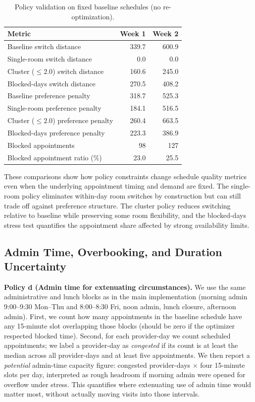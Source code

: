 \documentclass[12pt]{article}
\begin{document}
\begin{table}[h]
  \centering
  \caption{Policy validation on fixed baseline schedules (no re-optimization).}
  \label{tab:policy_validation}
  \begin{tabular}{lrr}
    \toprule
    Metric & Week 1 & Week 2 \\
    \midrule
    Baseline switch distance                  & 339.7 & 600.9 \\
    Single-room switch distance               & 0.0   & 0.0   \\
    Cluster ($\le 2.0$) switch distance       & 160.6 & 245.0 \\
    Blocked-days switch distance              & 270.5 & 408.2 \\
    \midrule
    Baseline preference penalty               & 318.7 & 525.3 \\
    Single-room preference penalty            & 184.1 & 516.5 \\
    Cluster ($\le 2.0$) preference penalty    & 260.4 & 663.5 \\
    Blocked-days preference penalty           & 223.3 & 386.9 \\
    \midrule
    Blocked appointments                      & 98    & 127   \\
    Blocked appointment ratio (\%)            & 23.0  & 25.5  \\
    \bottomrule
  \end{tabular}
\end{table}

These comparisons show how policy constraints change schedule quality metrics even when the
underlying appointment timing and demand are fixed. The single-room policy eliminates within-day
room switches by construction but can still trade off against preference structure. The cluster
policy reduces switching relative to baseline while preserving some room flexibility, and the
blocked-days stress test quantifies the appointment share affected by strong availability limits.

\subsection*{Admin Time, Overbooking, and Duration Uncertainty}

\textbf{Policy d (Admin time for extenuating circumstances).} We use the same administrative and lunch blocks as in the main implementation (morning admin 9:00--9:30 Mon--Thu and 8:00--8:30 Fri, noon admin, lunch closure, afternoon admin). First, we count how many appointments in the baseline schedule have any 15-minute slot overlapping those blocks (should be zero if the optimizer respected blocked time). Second, for each provider-day we count scheduled appointments; we label a provider-day as \emph{congested} if its count is at least the median across all provider-days and at least five appointments. We then report a \emph{potential} admin-time capacity figure: congested provider-days $\times$ four 15-minute slots per day, interpreted as rough headroom if morning admin were opened for overflow under stress. This quantifies where extenuating use of admin time would matter most, without actually moving visits into those intervals.
\end{document}
